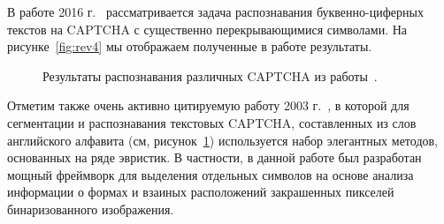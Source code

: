 \documentclass[a4paper,12pt,russian]{article} %
\begin{document}
В работе 2016 г.~\cite{hussain2016segmentation} рассматривается задача распознавания буквенно-циферных текстов на CAPTCHA с существенно перекрывающимися символами. На рисунке~\ref{fig:rev4} мы отображаем полученные в работе результаты.

\begin{figure}[t!]
	\caption{
		Результаты распознавания различных CAPTCHA из работы~\cite{mori2003recognizing}.
        }
        \label{fig:rev5}
\end{figure}

Отметим также очень активно цитируемую работу 2003 г.~\cite{mori2003recognizing}, в которой для сегментации и распознавания текстовых CAPTCHA, составленных из слов английского алфавита (см, рисунок~\ref{fig:rev5}) используется набор элегантных методов, основанных на ряде эвристик.
В частности, в данной работе был разработан мощный фреймворк для выделения отдельных символов на основе анализа информации о формах и взаиных расположений закрашенных пикселей бинаризованного изображения.
\end{document}
